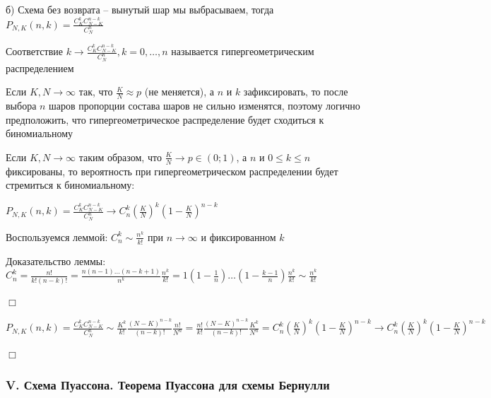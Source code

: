 \documentclass[12pt]{article}
\begin{document}
    б) Схема без возврата -- вынутый шар мы выбрасываем, тогда
    $P_{N, K} (n, k) = \frac{C^k_K C^{n - k}_{N - K}}{C^n_N}$

    \hypertarget{hypergeometricdistribution}{}

    \Def Соответствие $k \rightarrow \frac{C^k_K C^{n - k}_{N - K}}{C^n_N}, k = 0, \dots, n$ называется гипергеометрическим
    распределением

    \Nota Если $K, N \to \infty$ так, что $\frac{K}{N} \approx p$ (не меняется), а $n$ и $k$ зафиксировать, то после выбора
    $n$ шаров пропорции состава шаров не сильно изменятся, поэтому логично предположить, что гипергеометрическое распределение
    будет сходиться к биномиальному

    \hypertarget{hypergeometricasimptotic}{}

    \begin{MyTheorem}
        \Ths Если $K, N \to \infty$ таким образом, что $\frac{K}{N} \to p \in (0;1)$, а $n$ и $0 \leq k \leq n$ фиксированы, то
        вероятность при гипергеометрическом распределении будет стремиться к биномиальному:

        $P_{N,K} (n, k) = \frac{C^k_K C^{n - k}_{N - K}}{C^n_N} \rightarrow C^k_n \left(\frac{K}{N}\right)^k \left(1 - \frac{K}{N}\right)^{n - k}$
    \end{MyTheorem}

    Воспользуемся леммой: $C^k_n \sim \frac{n^k}{k!}$ при $n \to \infty$ и фиксированном $k$

    Доказательство леммы: $C_n^k = \frac{n!}{k!(n - k)!} = \frac{n(n - 1) \dots (n - k + 1)}{n^k} \frac{n^k}{k!} = 1 \left(1 - \frac{1}{n}\right) \dots \left(1 - \frac{k - 1}{n}\right) \frac{n^k}{k!} \sim \frac{n^k}{k!}$

    \begin{MyProof}
        $\Box$

        $P_{N,K} (n, k) = \frac{C^k_K C_{N - K}^{n - k}}{C^n_N} \sim \frac{K^k}{k!} \frac{(N - K)^{n - k}}{(n - k)!} \frac{n!}{N^n} =
        \frac{n!}{k!} \frac{(N - K)^{n - k}}{(n - k)!} \frac{K^k}{N^n} = C^k_n \left(\frac{K}{N}\right)^k \left(1 - \frac{K}{N}\right)^{n - k} \to C^k_n \left(\frac{K}{N}\right)^k \left(1 - \frac{K}{N}\right)^{n - k} $

        $\Box$
    \end{MyProof}

    \hypertarget{poissonschema}{}

    \subsubsection{V. Схема Пуассона. Теорема Пуассона для схемы Бернулли}
\end{document}
